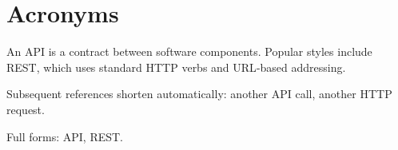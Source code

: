 \documentclass{article}
\begin{document}
\section{Acronyms}

\begin{acronym}
\end{acronym}

An \ac{API} is a contract between software components. Popular styles include \ac{REST}, which uses standard \ac{HTTP} verbs and \ac{URL}-based addressing.

Subsequent references shorten automatically: another \ac{API} call, another \ac{HTTP} request.

Full forms: \acl{API}, \acl{REST}.
\end{document}
